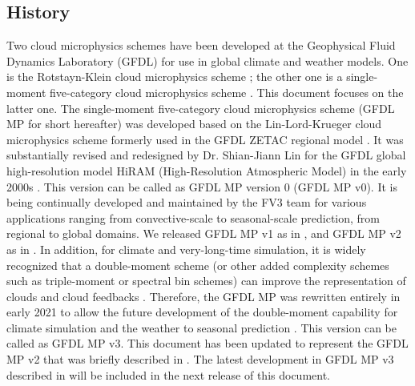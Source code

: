 \documentclass[letterpaper,titlepage,10pt]{article}
\numberwithin{equation}{section}
\begin{document}

\subsection{History}

Two cloud microphysics schemes have been developed at the Geophysical Fluid Dynamics Laboratory (GFDL) for use in global climate and weather models. One is the Rotstayn-Klein cloud microphysics scheme \citep{rotstayn1997aphy, klein1999vali, rotstayn2000asch, jakob2000apar}; the other one is a single-moment five-category cloud microphysics scheme \citep{chen2011ther, chen2013seas, zhou2019towa, harris2020gfdl, zhou2022impr}. This document focuses on the latter one. The single-moment five-category cloud microphysics scheme (GFDL MP for short hereafter) was developed based on the Lin-Lord-Krueger cloud microphysics scheme \citep{lin1983bulk, lord1984role, krueger1995impr} formerly used in the GFDL ZETAC regional model \citep{pauluis2006sens, knutson2007simu, knutson2008simu}. It was substantially revised and redesigned by Dr. Shian-Jiann Lin for the GFDL global high-resolution model HiRAM (High-Resolution Atmospheric Model) in the early 2000s \citep{zhao2009simu, chen2011ther, chen2013seas, harris2016high, gao2017impa, gao2019impr}. This version can be called as GFDL MP version 0 (GFDL MP v0). It is being continually developed and maintained by the FV3 team for various applications ranging from convective-scale to seasonal-scale prediction, from regional to global domains. We released GFDL MP v1 as in \citep{zhou2019towa}, and GFDL MP v2 as in \citet{harris2020gfdl}. In addition, for climate and very-long-time simulation, it is widely recognized that a double-moment scheme (or other added complexity schemes such as triple-moment or spectral bin schemes) can improve the representation of clouds and cloud feedbacks \citep{reisner1998expl, swann1998sens, luo2008arct, morrison2009impa, dawson2010comp, milbrandt2010sedi, jung2012ense, molthan2012comp, vanweverberg2012sens, baba2014depe, jin2014thei, igel2015make}. Therefore, the GFDL MP was rewritten entirely in early 2021 to allow the future development of the double-moment capability for climate simulation and the weather to seasonal prediction \citep{zhou2022impr}. This version can be called as GFDL MP v3. This document has been updated to represent the GFDL MP v2 that was briefly described in \citet{harris2020gfdl}. The latest development in GFDL MP v3 described in \citet{zhou2022impr} will be included in the next release of this document.
\end{document}
